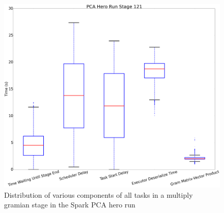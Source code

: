 



\begin{figure}[t]
\includegraphics[width=.5\textwidth]{fig/box_and_whiskers.png}
\caption{Distribution of various components of all tasks in a multiply gramian stage in the Spark PCA hero run }
\label{fig:tofix-5}
\end{figure}


